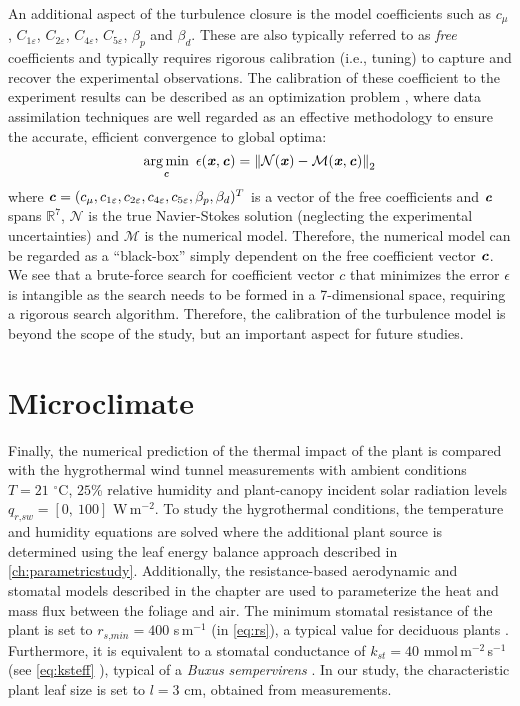 An additional aspect of the turbulence closure is the model coefficients such as $c_{\mu}$, $C_{1\varepsilon}$, $C_{2\varepsilon}$, $C_{4\varepsilon}$, $C_{5\varepsilon}$, $\beta_p$ and $\beta_d$. These are also typically referred to as \textit{free} coefficients and typically requires rigorous calibration (i.e., tuning) to capture and recover the experimental observations. The calibration of these coefficient to the experiment results can be described as an optimization problem \citep{Margheri2014, Duraisamy2018, Couplet2005, Najm2009, Lucor2007, Gorle2015a}, where data assimilation techniques are well regarded as an effective methodology to ensure the accurate, efficient convergence to global optima:
\begin{equation}
\mathop {\arg \min }\limits_{\textbf{\textit{c}}}\ \epsilon(\textbf{\textit{x}}, \textbf{\textit{c}}) = \left\| {\mathcal{N}(\textbf{\textit{x}}) - \mathcal{M}(\textbf{\textit{x}},\textbf{\textit{c}})} \right\|_2 
\end{equation}
where $\textbf{\textit{c}}=({{c_\mu },{c_{1\varepsilon }},{c_{2\varepsilon }},{c_{4\varepsilon }},{c_{5\varepsilon }},{\beta _p},{\beta _d}})^T$ is a vector of the free coefficients and $\textbf{\textit{c}}$ spans $\mathbb{R}^7$, $\mathcal{N}$ is the true Navier-Stokes solution (neglecting the experimental uncertainties) and $\mathcal{M}$ is the numerical model. Therefore, the numerical model can be regarded as a ``black-box'' simply dependent on the free coefficient vector $\textbf{\textit{c}}$. We see that a brute-force search for coefficient vector $c$ that minimizes the error $\epsilon$ is intangible as the search needs to be formed in a 7-dimensional space, requiring a rigorous search algorithm. Therefore, the calibration of the turbulence model is beyond the scope of the study, but an important aspect for future studies. 

\section{Microclimate}
\label{sec:Microclimate}

Finally, the numerical prediction of the thermal impact of the plant is compared with the hygrothermal wind tunnel measurements with ambient conditions $T = 21$ $^{\circ}$C, $25$\% relative humidity and plant-canopy incident solar radiation levels $q_{\textit{r,sw}} = \left[0,\ 100\right]$ W\,m$^{-2}$. To study the hygrothermal conditions, the temperature and humidity equations are solved where the additional plant source is determined using the leaf energy balance approach described in \cref{ch:parametricstudy}. Additionally, the resistance-based aerodynamic and stomatal models described in the chapter are used to parameterize the heat and mass flux between the foliage and air. The minimum stomatal resistance of the plant is set to $r_{\textit{s,min}} = 400$ s\,m$^{-1}$ (in \cref{eq:rs}), a typical value for deciduous plants \citep{Baille1994,Bruse1998}. Furthermore, it is equivalent to a stomatal conductance of $k_{\textit{st}} = 40$ mmol\,m$^{-2}$\,s$^{-1}$ (see \cref{eq:ksteff} ), typical of a \textit{Buxus} \textit{sempervirens} \citep{Rodriguez-Calcerrada2013a,Letts2012}. In our study, the characteristic plant leaf size is set to $l=3$ cm, obtained from measurements.

